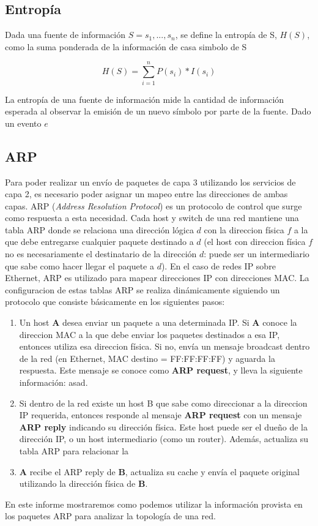 \subsection{Entropía}

Dada una fuente de información $S={s_{1},...,s_{n}}$, se define la entropía de S, $H(S)$, como la suma ponderada de la información de casa simbolo de S

$$H(S)=\sum^{n}_{i=1}{P(s_{i})*I(s_{i})}$$

La entropía de una fuente de información mide la cantidad de información esperada al observar la emisión de un nuevo símbolo por parte de la fuente. Dado un evento $e$

\subsection{ARP}

Para poder realizar un envío de paquetes de capa 3 utilizando los servicios de capa 2, es necesario poder asignar un mapeo entre las direcciones de ambas capas. ARP (\textsl{Address Resolution Protocol}) es un protocolo de control que surge como respuesta a esta necesidad.  Cada host y switch de una red mantiene una tabla ARP donde se relaciona una dirección lógica $d$ con la direccion física $f$ a la que debe entregarse cualquier paquete destinado a $d$ (el host con direccion física $f$ no es necesariamente el destinatario de la dirección $d$: puede ser un intermediario que sabe como hacer llegar el paquete a $d$). En el caso de redes IP sobre Ethernet, ARP es utilizado para mapear direcciones IP con direcciones MAC. 
La configuracion de estas tablas ARP se realiza dinámicamente siguiendo un protocolo que consiste básicamente en los siguientes pasos:

\begin{enumerate}
	\item Un host \textbf{A} desea enviar un paquete a una determinada IP. Si \textbf{A} conoce la direccion MAC a la que debe enviar los paquetes destinados a esa IP, entonces utiliza esa direccion física. Si no, envía un mensaje broadcast dentro de la red (en Ethernet, MAC destino = FF:FF:FF:FF) y aguarda la respuesta. Este mensaje se conoce como \textbf{ARP request}, y lleva la siguiente información:
	\subitem asad.
	\item Si dentro de la red existe un host B que sabe como direccionar a la direccion IP requerida, entonces responde al mensaje \textbf{ARP request} con un mensaje \textbf{ARP reply} indicando su dirección física. Este host puede ser el dueño de la dirección IP, o un host intermediario (como un router). Además, actualiza su tabla ARP para relacionar la 
	\item \textbf{A} recibe el ARP reply de \textbf{B}, actualiza su cache y envía el paquete original utilizando la dirección física de \textbf{B}.
\end{enumerate}

En este informe mostraremos como podemos utilizar la información provista en los paquetes ARP para analizar la topología de una red.



